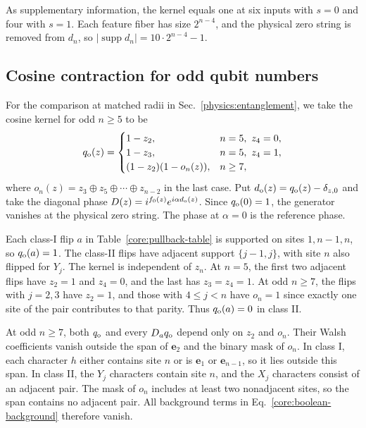 As supplementary information, the kernel equals one at six inputs with $s=0$ and four with $s=1$. Each feature fiber has size $2^{n-4}$, and the physical zero string is removed from $d_n$, so $|\operatorname{supp}d_n|=10\cdot2^{n-4}-1$.

\subsection{Cosine contraction for odd qubit numbers}
\label{core:odd-cosine}

For the comparison at matched radii in Sec.~\ref{physics:entanglement}, we take the cosine kernel for odd $n\ge5$ to be
\begin{equation}
 q_{\rm o}(z)=\begin{cases}
  1-z_2,& n=5,\ z_4=0,\\
  1-z_3,& n=5,\ z_4=1,\\
  (1-z_2)(1-o_n(z)),& n\ge7,
 \end{cases}
 \label{core:odd-cosine-kernel}
\end{equation}
where $o_n(z)=z_3\oplus z_5\oplus\cdots\oplus z_{n-2}$ in the last case. Put $d_{\rm o}(z)=q_{\rm o}(z)-\delta_{z,0}$ and take the diagonal phase $D(z)=i^{f_0(z)}e^{i\alpha d_{\rm o}(z)}$. Since $q_{\rm o}(0)=1$, the generator vanishes at the physical zero string. The phase at $\alpha=0$ is the reference phase.

Each class-I flip $a$ in Table~\ref{core:pullback-table} is supported on sites $1,n-1,n$, so $q_{\rm o}(a)=1$. The class-II flips have adjacent support $\{j-1,j\}$, with site $n$ also flipped for $Y_j$. The kernel is independent of $z_n$. At $n=5$, the first two adjacent flips have $z_2=1$ and $z_4=0$, and the last has $z_3=z_4=1$. At odd $n\ge7$, the flips with $j=2,3$ have $z_2=1$, and those with $4\le j<n$ have $o_n=1$ since exactly one site of the pair contributes to that parity. Thus $q_{\rm o}(a)=0$ in class II.

At odd $n\ge7$, both $q_{\rm o}$ and every $D_aq_{\rm o}$ depend only on $z_2$ and $o_n$. Their Walsh coefficients vanish outside the span of $\mathbf e_2$ and the binary mask of $o_n$. In class I, each character $h$ either contains site $n$ or is $\mathbf e_1$ or $\mathbf e_{n-1}$, so it lies outside this span. In class II, the $Y_j$ characters contain site $n$, and the $X_j$ characters consist of an adjacent pair. The mask of $o_n$ includes at least two nonadjacent sites, so the span contains no adjacent pair. All background terms in Eq.~\eqref{core:boolean-background} therefore vanish.

